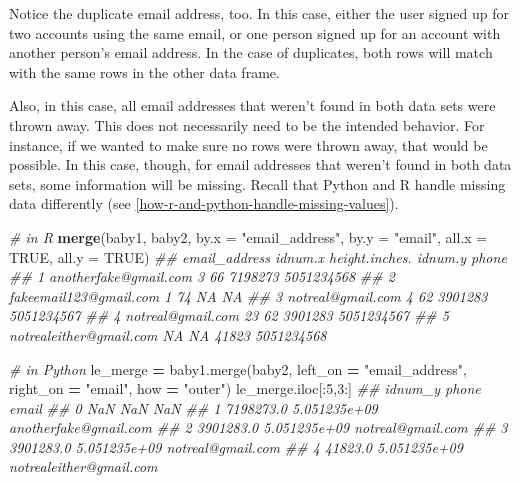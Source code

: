 \documentclass[12pt,krantz2]{krantz}
\makeatletter
\newenvironment{Shaded}{\begin{snugshade}}{\end{snugshade}}
\newcommand{\CommentTok}[1]{\textcolor[rgb]{0.37,0.37,0.37}{\textit{#1}}}
\newcommand{\DataTypeTok}[1]{\textcolor[rgb]{0.27,0.27,0.27}{#1}}
\newcommand{\DecValTok}[1]{\textcolor[rgb]{0.06,0.06,0.06}{#1}}
\newcommand{\KeywordTok}[1]{\textcolor[rgb]{0.27,0.27,0.27}{\textbf{#1}}}
\newcommand{\NormalTok}[1]{#1}
\newcommand{\OperatorTok}[1]{\textcolor[rgb]{0.43,0.43,0.43}{\textbf{#1}}}
\newcommand{\OtherTok}[1]{\textcolor[rgb]{0.37,0.37,0.37}{#1}}
\newcommand{\StringTok}[1]{\textcolor[rgb]{0.5,0.5,0.5}{#1}}
\newenvironment{kframe}{%
\medskip{}
\setlength{\fboxsep}{.8em}
 \def\at@end@of@kframe{}%
 \ifinner\ifhmode%
  \def\at@end@of@kframe{\end{minipage}}%
  \begin{minipage}{\columnwidth}%
 \fi\fi%
 \def\FrameCommand##1{\hskip\@totalleftmargin \hskip-\fboxsep
 \colorbox{shadecolor}{##1}\hskip-\fboxsep
     \hskip-\linewidth \hskip-\@totalleftmargin \hskip\columnwidth}%
 \MakeFramed {\advance\hsize-\width
   \@totalleftmargin\z@ \linewidth\hsize
   \@setminipage}}%
 {\par\unskip\endMakeFramed%
 \at@end@of@kframe}
\renewenvironment{Shaded}{\begin{kframe}}{\end{kframe}}
\makeatother
\begin{document}
Notice the duplicate email address, too. In this case, either the user signed up for two accounts using the same email, or one person signed up for an account with another person's email address. In the case of duplicates, both rows will match with the same rows in the other data frame.

Also, in this case, all email addresses that weren't found in both data sets were thrown away. This does not necessarily need to be the intended behavior. For instance, if we wanted to make sure no rows were thrown away, that would be possible. In this case, though, for email addresses that weren't found in both data sets, some information will be missing. Recall that Python and R handle missing data differently (see \ref{how-r-and-python-handle-missing-values}).

\begin{Shaded}
\begin{Highlighting}[]
\CommentTok{# in R}
\KeywordTok{merge}\NormalTok{(baby1, baby2, }
      \DataTypeTok{by.x =} \StringTok{"email_address"}\NormalTok{, }\DataTypeTok{by.y =} \StringTok{"email"}\NormalTok{, }
      \DataTypeTok{all.x =} \OtherTok{TRUE}\NormalTok{, }\DataTypeTok{all.y =} \OtherTok{TRUE}\NormalTok{)}
\CommentTok{##             email_address idnum.x height.inches. idnum.y      phone}
\CommentTok{## 1   anotherfake@gmail.com       3             66 7198273 5051234568}
\CommentTok{## 2  fakeemail123@gmail.com       1             74      NA         NA}
\CommentTok{## 3       notreal@gmail.com       4             62 3901283 5051234567}
\CommentTok{## 4       notreal@gmail.com      23             62 3901283 5051234567}
\CommentTok{## 5 notrealeither@gmail.com      NA             NA   41823 5051234568}
\end{Highlighting}
\end{Shaded}

\begin{Shaded}
\begin{Highlighting}[]
\CommentTok{# in Python}
\NormalTok{le_merge }\OperatorTok{=}\NormalTok{ baby1.merge(baby2, }
\NormalTok{                       left_on }\OperatorTok{=} \StringTok{"email_address"}\NormalTok{, right_on }\OperatorTok{=} \StringTok{"email"}\NormalTok{, }
\NormalTok{                       how }\OperatorTok{=} \StringTok{"outer"}\NormalTok{)}
\NormalTok{le_merge.iloc[:}\DecValTok{5}\NormalTok{,}\DecValTok{3}\NormalTok{:]}
\CommentTok{##      idnum_y         phone                    email}
\CommentTok{## 0        NaN           NaN                      NaN}
\CommentTok{## 1  7198273.0  5.051235e+09    anotherfake@gmail.com}
\CommentTok{## 2  3901283.0  5.051235e+09        notreal@gmail.com}
\CommentTok{## 3  3901283.0  5.051235e+09        notreal@gmail.com}
\CommentTok{## 4    41823.0  5.051235e+09  notrealeither@gmail.com}
\end{Highlighting}
\end{Shaded}
\end{document}
